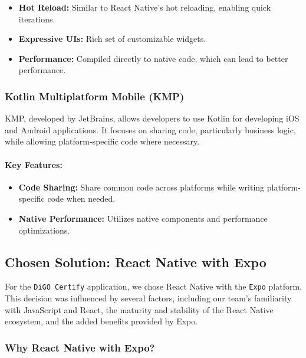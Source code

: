 \begin{itemize}
    \item \textbf{Hot Reload:} Similar to React Native's hot reloading, enabling quick iterations.
    \item \textbf{Expressive UIs:} Rich set of customizable widgets.
    \item \textbf{Performance:} Compiled directly to native code, which can lead to better performance.
\end{itemize}

\subsubsection{Kotlin Multiplatform Mobile (KMP)}

KMP, developed by JetBrains, allows developers to use Kotlin for developing iOS and Android applications. It focuses on sharing code, particularly business logic, while allowing platform-specific code where necessary\cite{KMP}.

\paragraph{Key Features:}

\begin{itemize}
    \item \textbf{Code Sharing:} Share common code across platforms while writing platform-specific code when needed.
    \item \textbf{Native Performance:} Utilizes native components and performance optimizations.
\end{itemize}

\subsection{Chosen Solution: React Native with Expo}

For the \texttt{DiGO Certify} application, we chose React Native with the \texttt{Expo} platform. This decision was influenced by several factors, including our team's familiarity with JavaScript and React, the maturity and stability of the React Native ecosystem, and the added benefits provided by Expo\cite{Expo}.

\subsubsection{Why React Native with Expo?}

